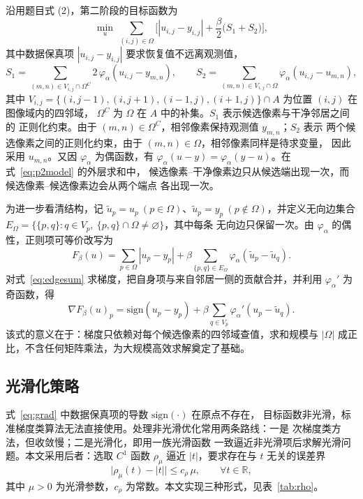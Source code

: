 \documentclass[withoutpreface,bwprint]{cumcmthesis}
\begin{document}
沿用题目式 (2)，第二阶段的目标函数为
\begin{equation}
  \min_{u}\ \sum_{(i,j)\in\Omega}\Big[|u_{i,j}-y_{i,j}|+\frac{\beta}{2}\big(S_1+S_2\big)\Big],
  \label{eq:p2model}
\end{equation}
其中数据保真项 $|u_{i,j}-y_{i,j}|$ 要求恢复值不远离观测值，
\begin{equation}
  S_1=\sum_{(m,n)\in V_{i,j}\cap\Omega^{C}}2\,\varphi_{\alpha}(u_{i,j}-y_{m,n}),
  \qquad
  S_2=\sum_{(m,n)\in V_{i,j}\cap\Omega}\varphi_{\alpha}(u_{i,j}-u_{m,n}),
\end{equation}
其中 $V_{i,j}=\{(i,j-1),(i,j+1),(i-1,j),(i+1,j)\}\cap A$ 为位置
$(i,j)$ 在图像域内的四邻域，
$\Omega^{C}$ 为 $\Omega$ 在 $A$ 中的补集。$S_1$ 表示候选像素与干净邻居之间的
正则化约束。由于 $(m,n)\in\Omega^C$，相邻像素保持观测值 $y_{m,n}$；$S_2$ 表示
两个候选像素之间的正则化约束，由于 $(m,n)\in\Omega$，相邻像素同样是待求变量，
因此采用 $u_{m,n}$。又因 $\varphi_\alpha$ 为偶函数，有
$\varphi_\alpha(u-y)=\varphi_\alpha(y-u)$。在式~\eqref{eq:p2model} 的外层求和中，
候选像素--干净像素边只从候选端出现一次，而候选像素--候选像素边会从两个端点
各出现一次。

为进一步看清结构，记 $\tilde u_p=u_p\ (p\in\Omega)$、$\tilde u_p=y_p\
(p\notin\Omega)$，并定义无向边集合
$E_{\Omega}=\{\{p,q\}:q\in V_p,\ \{p,q\}\cap\Omega\neq\varnothing\}$，其中每条
无向边只保留一次。由 $\varphi_{\alpha}$ 的偶性，正则项可等价改写为
\begin{equation}
  F_{\beta}(u)=\sum_{p\in\Omega}|u_p-y_p|+\beta\sum_{\{p,q\}\in E_{\Omega}}
  \varphi_{\alpha}(\tilde u_p-\tilde u_q).
  \label{eq:edgesum}
\end{equation}
对式~\eqref{eq:edgesum} 求梯度，把自身项与来自邻居一侧的贡献合并，并利用
$\varphi_{\alpha}'$ 为奇函数，得
\begin{equation}
  \nabla F_{\beta}(u)_p=\mathrm{sign}(u_p-y_p)+\beta\sum_{q\in V_p}
  \varphi_{\alpha}'(u_p-\tilde u_q).
  \label{eq:grad}
\end{equation}
该式的意义在于：梯度只依赖对每个候选像素的四邻域查值，求和规模与 $|\Omega|$
成正比，不含任何矩阵乘法，为大规模高效求解奠定了基础。

\subsection{光滑化策略}

式~\eqref{eq:grad} 中数据保真项的导数 $\mathrm{sign}(\cdot)$ 在原点不存在，
目标函数非光滑，标准梯度类算法无法直接使用。处理非光滑优化常用两条路线：一是
次梯度类方法，但收敛慢；二是光滑化\cite{wu2021,chen2010}，即用一族光滑函数
一致逼近非光滑项后求解光滑问题。本文采用后者：选取 $C^1$ 函数 $\rho_{\mu}$
逼近 $|t|$，要求存在与 $t$ 无关的误差界
\begin{equation}
  \big|\rho_{\mu}(t)-|t|\big|\le c_{\rho}\,\mu,\qquad \forall t\in\mathbb{R},
  \label{eq:rhobound}
\end{equation}
其中 $\mu>0$ 为光滑参数，$c_{\rho}$ 为常数。本文实现三种形式，见表~\ref{tab:rho}。
\end{document}
